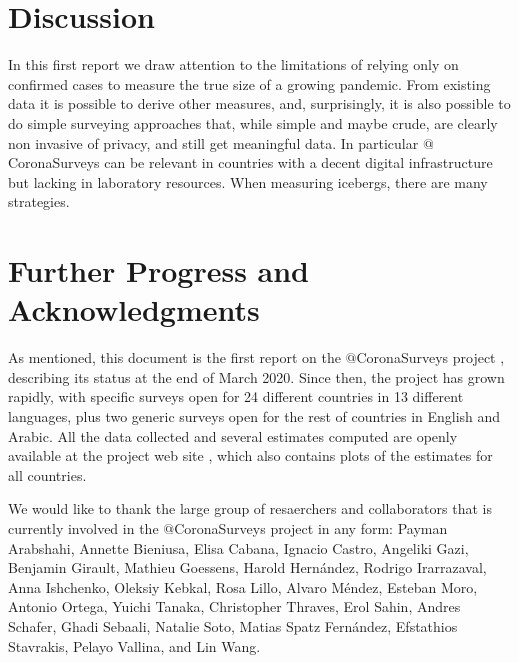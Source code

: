 \documentclass{article}
\begin{document}
\section{Discussion}

In this first report we draw attention to the limitations of relying only on confirmed cases to measure the true size of a growing pandemic. From existing data it is possible to derive other measures, and, surprisingly, it is also possible to do simple surveying approaches that, while simple and maybe crude, are clearly non invasive of privacy, and still get meaningful data. In particular  $@$CoronaSurveys can be relevant in countries with a decent digital infrastructure but lacking in laboratory resources. When measuring icebergs,  there are many strategies. 

\section{Further Progress and Acknowledgments}

As mentioned, this document is the first report on the $@$CoronaSurveys project \cite{CoronaSurveys}, describing its status at the end of March 2020. Since then, the project has grown rapidly, with specific surveys open for 24 different countries in 13 different languages, plus two generic surveys open for the rest of countries in English and Arabic. All the data collected and several estimates computed are openly available at the project web site \cite{CoronaSurveys}, which also contains plots of the estimates for all countries.

We would like to thank the large group of resaerchers and collaborators that is currently involved in the $@$CoronaSurveys project in any form: 
Payman Arabshahi,
Annette Bieniusa,
Elisa Cabana,
Ignacio Castro, 
Angeliki Gazi, 
Benjamin Girault, 
Mathieu Goessens, 
Harold Hernández,
Rodrigo Irarrazaval,
Anna Ishchenko,
Oleksiy Kebkal,
Rosa Lillo, 
Alvaro Méndez,
Esteban Moro,
Antonio Ortega, 
Yuichi Tanaka, 
Christopher Thraves, 
Erol Sahin,
Andres Schafer,
Ghadi Sebaali,
Natalie Soto,
Matias Spatz Fernández,
Efstathios Stavrakis, 
Pelayo Vallina, 
and
Lin Wang.




\end{document}
